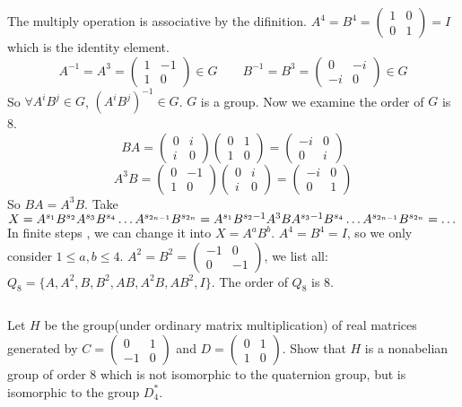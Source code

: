 \begin{answer}
    The multiply operation is associative by the difinition. $A^{4}=B^{4}=\begin{pmatrix}
        1&0\\0&1
    \end{pmatrix}=I$ which is the identity element.\[A^{-1}=A^{3}=\begin{pmatrix}
        1&-1\\1&0
    \end{pmatrix}\in G\qquad B^{-1}=B^{3}=\begin{pmatrix}
        0&-i\\-i&0
    \end{pmatrix}\in G\] So $\forall A^{i}B^{j}\in G$, $(A^{i}B^{j})^{-1}\in G$. $G$ is a group. Now we examine the order of $G$ is 8.\[BA=\begin{pmatrix}
        0&i\\i&0
    \end{pmatrix}\begin{pmatrix}
        0&1\\1&0
    \end{pmatrix}=\begin{pmatrix}
        -i&0\\0&i
    \end{pmatrix}\]\[A^3B=\begin{pmatrix}
        0&-1\\1&0
    \end{pmatrix}\begin{pmatrix}
        0&i\\i&0
    \end{pmatrix}=\begin{pmatrix}
        -i&0\\0&1
    \end{pmatrix}\]So $BA=A^3B$. Take $X=A^{s_1}B^{s_2}A^{s_3}B^{s_4}\dots A^{s_{2n-1}}B^{s_{2n}}=A^{s_1}B^{s_2-1}A^3B\\A^{s_3-1}B^{s_4}\dots A^{s_{2n-1}}B^{s_{2n}}=\dots$ In finite steps , we can change it into $X=A^aB^b$. $A^{4}=B^{4}=I$, so we only consider $1\leq a,b\leq 4$. $A^{2}=B^{2}=\begin{pmatrix}
        -1&0\\0&-1
    \end{pmatrix}$, we list all: $Q_8=\{A, A^{2}, B, B^{2}, AB, A^{2}B, AB^{2}, I\}$. The order of $Q_8$ is 8.
\end{answer}

$$ $$

\begin{ex}
    Let $H$ be the group(under ordinary matrix multiplication) of real matrices generated by $C = \begin{pmatrix}
        0 & 1\\
        -1 & 0
    \end{pmatrix}$ and $D = \begin{pmatrix}
        0 & 1\\
        1 & 0
    \end{pmatrix}$. Show that $H$ is a nonabelian group of order 8 which is not isomorphic to the quaternion group, but is isomorphic to the group $D_4^*$.
\end{ex}

